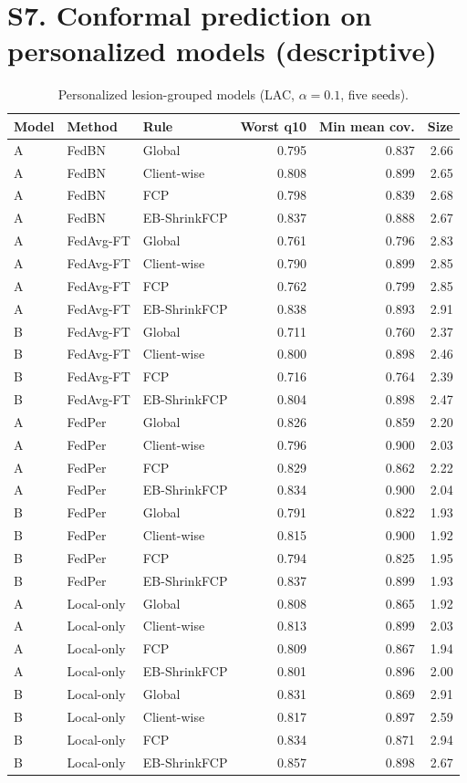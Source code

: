 \documentclass[10pt]{article}
\begin{document}
\section*{S7. Conformal prediction on personalized models (descriptive)}
\begin{table}[!htbp]
\centering
\scriptsize
\caption{Personalized lesion-grouped models (LAC, $\alpha=0.1$, five seeds).}
\label{tab:s7}
\begin{tabular}{@{}lllrrr@{}}
\toprule
Model & Method & Rule & Worst q10 & Min mean cov. & Size \\
\midrule
A & FedBN & Global & 0.795 & 0.837 & 2.66 \\
A & FedBN & Client-wise & 0.808 & 0.899 & 2.65 \\
A & FedBN & FCP & 0.798 & 0.839 & 2.68 \\
A & FedBN & EB-ShrinkFCP & 0.837 & 0.888 & 2.67 \\
A & FedAvg-FT & Global & 0.761 & 0.796 & 2.83 \\
A & FedAvg-FT & Client-wise & 0.790 & 0.899 & 2.85 \\
A & FedAvg-FT & FCP & 0.762 & 0.799 & 2.85 \\
A & FedAvg-FT & EB-ShrinkFCP & 0.838 & 0.893 & 2.91 \\
B & FedAvg-FT & Global & 0.711 & 0.760 & 2.37 \\
B & FedAvg-FT & Client-wise & 0.800 & 0.898 & 2.46 \\
B & FedAvg-FT & FCP & 0.716 & 0.764 & 2.39 \\
B & FedAvg-FT & EB-ShrinkFCP & 0.804 & 0.898 & 2.47 \\
A & FedPer & Global & 0.826 & 0.859 & 2.20 \\
A & FedPer & Client-wise & 0.796 & 0.900 & 2.03 \\
A & FedPer & FCP & 0.829 & 0.862 & 2.22 \\
A & FedPer & EB-ShrinkFCP & 0.834 & 0.900 & 2.04 \\
B & FedPer & Global & 0.791 & 0.822 & 1.93 \\
B & FedPer & Client-wise & 0.815 & 0.900 & 1.92 \\
B & FedPer & FCP & 0.794 & 0.825 & 1.95 \\
B & FedPer & EB-ShrinkFCP & 0.837 & 0.899 & 1.93 \\
A & Local-only & Global & 0.808 & 0.865 & 1.92 \\
A & Local-only & Client-wise & 0.813 & 0.899 & 2.03 \\
A & Local-only & FCP & 0.809 & 0.867 & 1.94 \\
A & Local-only & EB-ShrinkFCP & 0.801 & 0.896 & 2.00 \\
B & Local-only & Global & 0.831 & 0.869 & 2.91 \\
B & Local-only & Client-wise & 0.817 & 0.897 & 2.59 \\
B & Local-only & FCP & 0.834 & 0.871 & 2.94 \\
B & Local-only & EB-ShrinkFCP & 0.857 & 0.898 & 2.67 \\
\bottomrule
\end{tabular}
\end{table}
\end{document}
